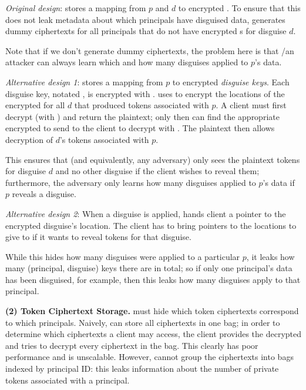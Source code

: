 \emph{Original design}: \sys stores a mapping from $p$ and $d$ to encrypted .
To ensure that this does not leak metadata about which principals have disguised data, \sys generates dummy ciphertexts for all
principals that do not have encrypted s for disguise $d$.

Note that if we don't generate dummy ciphertexts, the problem here is that \sys/an attacker can always
learn which and how many disguises applied to $p$'s data.

\vspace{12pt}
\emph{Alternative design 1}:
\sys stores a mapping from $p$ to encrypted \emph{disguise keys}. 
%
Each disguise key, notated , is encrypted with . 
\sys uses  to encrypt the locations of the encrypted  for all $d$ that produced
tokens associated with $p$.
A client must first decrypt (with ) and return the  plaintext; only then can \sys find the appropriate
encrypted  to send to the client to decrypt with . The plaintext  then allows decryption of
$d$'s tokens associated with $p$.

This ensures that \sys (and equivalently, any adversary) only sees the plaintext tokens for disguise
$d$ and no other disguise if the client wishes to reveal them; 
furthermore, the adversary only learns how many disguises applied to $p$'s data if $p$ reveals a
disguise.


\vspace{12pt}
\emph{Alternative design 2}: When a disguise is applied, \sys hands client a pointer to the
encrypted disguise's  location. The client has to bring pointers to the locations to give
to \sys if it wants to reveal tokens for that disguise.  

While this hides how many disguises were
applied to a particular $p$, it leaks how many (principal, disguise) keys there are in total; so if
only one principal's data has been disguised, for example, then this leaks how many disguises apply
to that principal.


\vspace{6pt}\noindent\textbf{(2) Token Ciphertext Storage.}
\sys must hide which token ciphertexts correspond to which principals.  Naively, \sys can store
all ciphertexts in one bag; in order to determine which ciphertexts a client may access, the client
provides the decrypted  and \sys tries to decrypt every ciphertext in the bag. This clearly
has poor performance and is unscalable.
However, \sys cannot group the ciphertexts into bags indexed by principal ID: this leaks information
about the number of private tokens associated with a principal.

